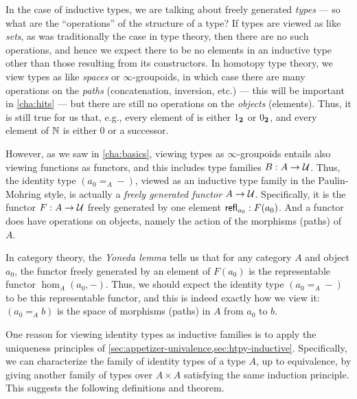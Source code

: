 In the case of inductive types, we are talking about freely generated \emph{types} --- so what are the ``operations'' of the structure of a type?
If types are viewed as like \emph{sets}, as was traditionally the case in type theory, then there are no such operations, and hence we expect there to be no elements in an inductive type other than those resulting from its constructors.
In homotopy type theory, we view types as like \emph{spaces} or $\infty$-groupoids, in which case there are many operations on the \emph{paths} (concatenation, inversion, etc.) --- this will be important in \autoref{cha:hits} --- but there are still no operations on the \emph{objects} (elements).
Thus, it is still true for us that, e.g., every element of \bool is either ${1_{\mathbf{2}}}$ or ${0_{\mathbf{2}}}$, and every element of $\mathbb{N}$ is either $0$ or a successor.

However, as we saw in \autoref{cha:basics}, viewing types as $\infty$-groupoids entails also viewing functions as functors, and this includes type families $B:A\to\mathcal{U}$.
Thus, the identity type $(a_0 =_A -)$, viewed as an inductive type family in the Paulin-Mohring style, is actually a \emph{freely generated functor} $A\to\mathcal{U}$.
Specifically, it is the functor $F:A\to\mathcal{U}$ freely generated by one element $\mathsf{refl}_{a_0}: F(a_0)$.
And a functor does have operations on objects, namely the action of the morphisms (paths) of $A$.

In category theory, the \emph{Yoneda lemma} tells us that for any category $A$ and object $a_0$, the functor freely generated by an element of $F(a_0)$ is the representable functor $\hom_A(a_0,-)$.
Thus, we should expect the identity type $(a_0 =_A -)$ to be this representable functor, and this is indeed exactly how we view it: $(a_0 =_A b)$ is the space of morphisms (paths) in $A$ from $a_0$ to $b$.

\mentalpause

One reason for viewing identity types as inductive families is to apply the uniqueness principles of \autoref{sec:appetizer-univalence,sec:htpy-inductive}.
Specifically, we can characterize the family of identity types of a type $A$, up to equivalence, by giving another family of types over $A\times A$ satisfying the same induction principle.
This suggests the following definitions and theorem.

